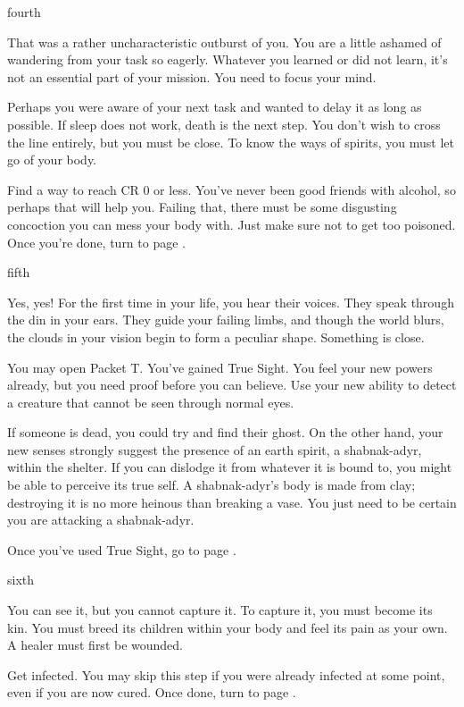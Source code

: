 \documentclass[greennotebook]{Pestilence} %
\begin{document}
\begin{page}{fourth}

That was a rather uncharacteristic outburst of you. You are a little ashamed of wandering from your task so eagerly. Whatever you learned or did not learn, it's not an essential part of your mission. You need to focus your mind. 

Perhaps you were aware of your next task and wanted to delay it as long as possible. If sleep does not work, death is the next step. You don't wish to cross the line entirely, but you must be close. To know the ways of spirits, you must let go of your body.

Find a way to reach CR 0 or less. You've never been good friends with alcohol, so perhaps that will help you. Failing that, there must be some disgusting concoction you can mess your body with. Just make sure not to get too poisoned. Once you're done, turn to page .

\end{page}

\begin{page}{fifth}

Yes, yes! For the first time in your life, you hear their voices. They speak through the din in your ears. They guide your failing limbs, and though the world blurs, the clouds in your vision begin to form a peculiar shape. Something is close.

You may open Packet T. You've gained True Sight. You feel your new powers already, but you need proof before you can believe. Use your new ability to detect a creature that cannot be seen through normal eyes. 

If someone is dead, you could try and find their ghost. On the other hand, your new senses strongly suggest the presence of an earth spirit, a shabnak-adyr, within the shelter. If you can dislodge it from whatever it is bound to, you might be able to perceive its true self. A shabnak-adyr's body is made from clay; destroying it is no more heinous than breaking a vase. You just need to be certain you are attacking a shabnak-adyr.

Once you've used True Sight, go to page .

\end{page}

\begin{page}{sixth}

You can see it, but you cannot capture it. To capture it, you must become its kin. You must breed its children within your body and feel its pain as your own. A healer must first be wounded.

Get infected. You may skip this step if you were already infected at some point, even if you are now cured. Once done, turn to page .

\end{page}
\end{document}
